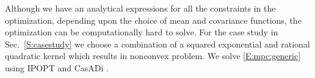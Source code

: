 Although we have an analytical expressions for all the constraints in the optimization, depending upon the choice of mean and covariance functions, the optimization can be computationally hard to solve. For the case study in Sec.~\ref{S:casestudy} we choose a combination of a squared exponential and rational quadratic kernel which results in nonconvex problem. We solve \eqref{E:mpc:generic} using IPOPT \cite{Waechter2009b} and CasADi \cite{Andersson2013b}.



